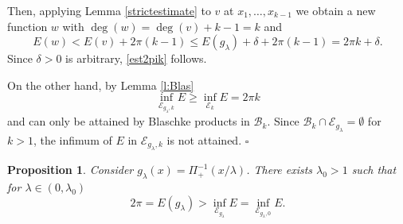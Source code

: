 \documentclass[12pt, a4paper]{article}
\newtheorem{prop}[thm]{Proposition}
\newcommand{\M}[1]{\mathcal{#1}}
\renewcommand{\(}{\left(}
\renewcommand{\)}{\right)}
\begin{document}
Then, applying Lemma \ref{strictestimate} to $v$ at $x_{1},\dots,x_{k-1}$ we obtain a new function $w$ with $\deg(w)=\deg(v)+k-1=k$ and
$$E(w)<E(v)+2\pi(k-1)\le E(g_\lambda)+\delta+2\pi(k-1)=2\pi k+\delta.$$
Since $\delta>0$ is arbitrary, \eqref{est2pik} follows.

On the other hand, by Lemma \ref{l:Blas}
$$\inf_{\M{E}_{g_\lambda,k}}E\ge\inf_{\M{E}_{k}}E =2\pi k$$
and can only be attained by Blaschke products in $\M{B}_k$. Since $\M{B}_k\cap \M{E}_{g_\lambda}=\emptyset$ for $k>1$, the infimum of $E$ in $\M{E}_{g_\lambda,k}$ is not attained.
\hfill$\square$

\begin{prop}\label{propex} Consider $g_\lambda(x)=\Pi_+^{-1}(x/\lambda)$. There exists $\lambda_0>1$ such that for $\lambda\in (0,\lambda_0)$
$$2\pi=E(g_\lambda)>\inf_{\M{E}_{g_\lambda}}E = \inf_{\M{E}_{g_\lambda,0}}E.$$
\end{prop}
\end{document}
